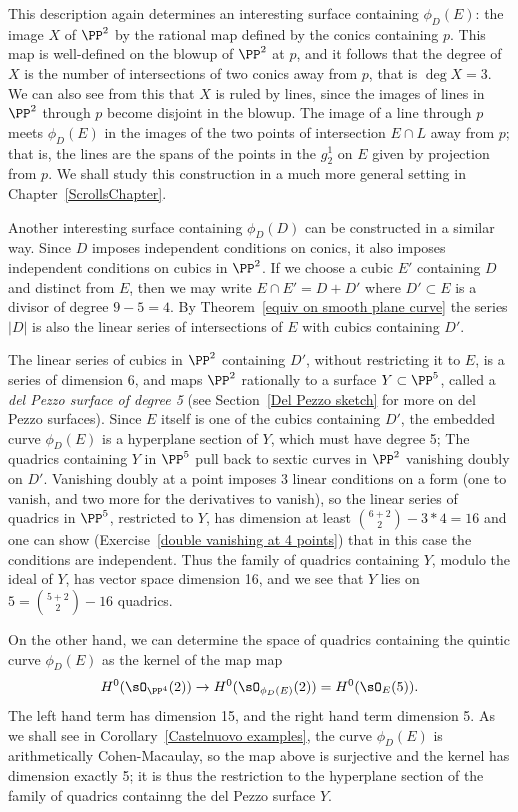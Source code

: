 This description again determines an interesting surface containing $\phi_D(E)$: the image $X$ of $\PP^2$ by the rational map
defined by the conics containing $p$. This map is well-defined on the blowup of $\PP^2$ at $p$, and it follows that the degree of $X$ is the number of intersections of two conics away from $p$, that is $\deg X = 3$. We can also see from this that $X$ is ruled by lines, since the images of lines in $\PP^2$ through $p$ become disjoint in the blowup. The image of a line through $p$ meets
$\phi_D(E)$ in the images of the two points of intersection $E\cap L$ away from $p$; that is, the lines are the spans of the
points in the $g^1_2$ on $E$ given by projection from $p$. We shall study this construction in a much more general setting
in Chapter~\ref{ScrollsChapter}.

Another interesting surface containing $\phi_D(D)$ can be constructed in a similar way.
Since $D$ imposes independent conditions on conics, it also imposes independent conditions on cubics in $\PP^2$.
If we choose a cubic $E'$ containing $D$ and distinct from $E$, then we may write $E\cap E' = D +D'$ where $D'\subset E$
is a divisor of degree $9-5 = 4$.  By Theorem~\ref{equiv on smooth plane curve} 
the series $|D|$ is also the linear series of intersections of $E$ with cubics containing $D'$. 

The linear series of cubics in $\PP^2$ containing $D'$, without restricting it to $E$, is a series of dimension $6$,
and maps $\PP^2$ rationally to a surface $Y\subset \PP^5$, called a \emph{del Pezzo surface of degree 5} (see Section~\ref{Del Pezzo sketch}
for more on del Pezzo surfaces). Since $E$ itself is one of the cubics containing $D'$, the embedded curve $\phi_D(E)$ is a hyperplane section of $Y$, which must have degree 5;  The quadrics containing $Y$ in $\PP^5$ pull back to 
sextic curves in $\PP^2$ vanishing doubly on $D'$. Vanishing doubly at a point imposes
3 linear conditions on a form (one to vanish, and two more for the derivatives to vanish), so the linear series of quadrics in $\PP^5$,
restricted to $Y$, has dimension at least
$
\binom{6+2}{2} - 3*4 = 16
$
and one can show (Exercise~\ref{double vanishing at 4 points}) that in this case the conditions are independent.
Thus the family of quadrics containing $Y$, modulo the ideal of $Y$, has vector space dimension 16, and we see that
$Y$ lies on $5 = \binom{5+2}{2} - 16$ quadrics.


On the other hand, we can determine the space of quadrics containing the quintic curve $\phi_D(E)$ as the kernel of the map
map 
$$
H^0(\sO_{\PP^4}(2)) \to H^0(\sO_{\phi_D(E)}(2)) = H^0(\sO_{E}(5)).
$$
The left hand term has dimension 15, and the right hand term dimension 5. As we shall see in Corollary~\ref{Castelnuovo examples}, the curve
$\phi_D(E)$ is arithmetically Cohen-Macaulay, so the map above is surjective and the kernel has dimension exactly 5; it is
thus the restriction to the hyperplane section of the family of quadrics containng the del Pezzo surface $Y$.

